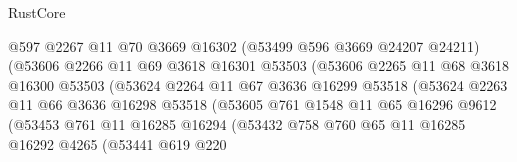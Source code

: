 \begin{lexlean}{RustCore}
\begin{coremodule}
                                @597
                                @2267
                                @11
                                @70
                                @3669
                                @16302
                                (@53499 @596 @3669 @24207 @24211)
                                (@53606
                                  @2266
                                  @11
                                  @69
                                  @3618
                                  @16301
                                  @53503
                                  (@53606
                                    @2265
                                    @11
                                    @68
                                    @3618
                                    @16300
                                    @53503
                                    (@53624
                                      @2264
                                      @11
                                      @67
                                      @3636
                                      @16299
                                      @53518
                                      (@53624
                                        @2263
                                        @11
                                        @66
                                        @3636
                                        @16298
                                        @53518
                                        (@53605
                                          @761
                                          @1548
                                          @11
                                          @65
                                          @16296
                                          @9612
                                          (@53453
                                            @761
                                            @11
                                            @16285
                                            @16294
                                            (@53432
                                              @758
                                              @760
                                              @65
                                              @11
                                              @16285
                                              @16292
                                              @4265
                                              (@53441
                                                @619
                                                @220

\end{coremodule}
\end{lexlean}
